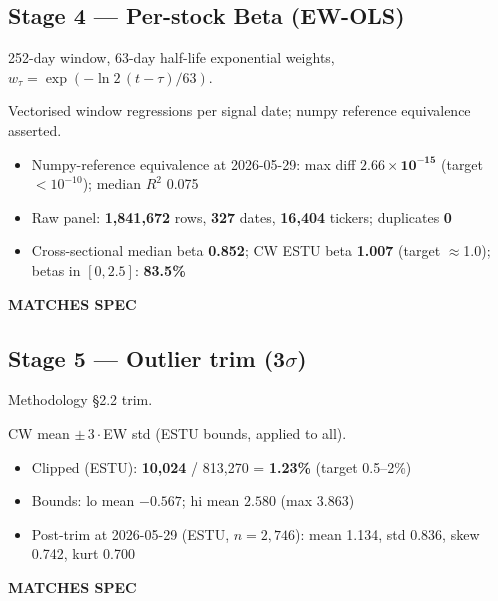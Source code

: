 \documentclass[11pt,a4paper]{article}
\newcommand{\PASS}[1]{\textcolor{pass}{\textbf{#1}}}
\begin{document}
\subsection{Stage 4 --- Per-stock Beta (EW-OLS)}

\begin{description}[style=nextline]
  \item[PDF SPEC] 252-day window, 63-day half-life exponential weights, $w_\tau = \exp(-\ln 2\,(t-\tau)/63)$.
  \item[Implementation] Vectorised window regressions per signal date; numpy reference equivalence asserted.
  \item[Observed]\phantom{x}
    \begin{itemize}[nosep, topsep=-\parskip]
      \item Numpy-reference equivalence at 2026-05-29: max diff $\mathbf{2.66\times10^{-15}}$ (target $<10^{-10}$); median $R^2$ 0.075
      \item Raw panel: \textbf{1{,}841{,}672} rows, \textbf{327} dates, \textbf{16{,}404} tickers; duplicates \textbf{0}
      \item Cross-sectional median beta \textbf{0.852}; CW ESTU beta \textbf{1.007} (target $\approx$1.0); betas in $[0,2.5]$: \textbf{83.5\%}
    \end{itemize}
  \item[Status] \PASS{MATCHES SPEC}
\end{description}

\subsection{Stage 5 --- Outlier trim (3$\sigma$)}

\begin{description}[style=nextline]
  \item[PDF SPEC] Methodology \S2.2 trim.
  \item[Implementation] CW mean $\pm\,3\cdot$EW std (ESTU bounds, applied to all).
  \item[Observed]\phantom{x}
    \begin{itemize}[nosep, topsep=-\parskip]
      \item Clipped (ESTU): \textbf{10{,}024} / 813{,}270 = \textbf{1.23\%} (target 0.5--2\%)
      \item Bounds: lo mean $-0.567$; hi mean $2.580$ (max $3.863$)
      \item Post-trim at 2026-05-29 (ESTU, $n=2{,}746$): mean 1.134, std 0.836, skew 0.742, kurt 0.700
    \end{itemize}
  \item[Status] \PASS{MATCHES SPEC}
\end{description}
\end{document}
